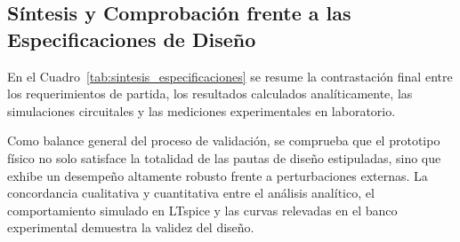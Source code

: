 \subsection{Síntesis y Comprobación frente a las Especificaciones de Diseño}
En el Cuadro~\ref{tab:sintesis_especificaciones} se resume la contrastación final entre los requerimientos de partida, los resultados calculados analíticamente, las simulaciones circuitales y las mediciones experimentales en laboratorio.

\begin{table}[!ht]
  \centering
  \caption{Síntesis comparativa final: especificaciones impuestas vs.\ cálculos analíticos, simulación en LTspice y mediciones de laboratorio.}
  \label{tab:sintesis_especificaciones}
\end{table}

Como balance general del proceso de validación, se comprueba que el prototipo
físico no solo satisface la totalidad de las pautas de diseño estipuladas, sino
que exhibe un desempeño altamente robusto frente a perturbaciones externas. La
concordancia cualitativa y cuantitativa entre el análisis analítico, el
comportamiento simulado en LTspice y las curvas relevadas en el banco
experimental demuestra la validez del diseño.
